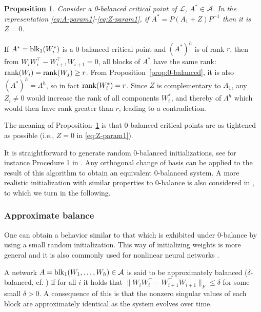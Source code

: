 \documentclass{article}
\makeatletter
\renewenvironment{proof}[1][\proofname]{
  \par\pushQED{\qed}\normalfont
  \topsep6\p@\@plus6\p@\relax
  \trivlist\item[\hskip\labelsep\bfseries#1\@addpunct{.}]
  \ignorespaces
}{
  \popQED\endtrivlist\@endpefalse
}
\newtheorem{proposition}{Proposition}
\def\rank{{\rm rank}}
\def\block{{\rm blk}}
\newcommand{\1}{\mathds{1}}
\makeatother
\begin{document}
\begin{proposition}
\label{prop:0-bal-crit-point}
Consider a 0-balanced critical point of $ \mathcal{L}$, $ A^\ast \in \mathcal{A}$.
In the representation \eqref{eq:A-param1}-\eqref{eq:Z-param1}, if $ A^\ast = P( A_1 + Z ) P^{-1} $ then it is $ Z = 0 $.
\end{proposition}
\begin{proof}
If $A^\ast =\block_1(W_i^\ast)$ is a 0-balanced critical point and $ (A^\ast)^h $ is of rank $ r $, then from $ W_i W_i^\top - W_{i+1}^\top W_{i+1} =0$, all blocks of $ A^\ast $ have the same rank: $ \rank(W_i) = \rank(W_j)  \geq r $. From Proposition~\ref{prop:0-balanced}, it is also $ (A^\ast)^h = \Lambda^h $, so in fact $ \rank(W_i^\ast) = r $. Since $ Z $ is complementary to $ A_1 $, any $ Z_i \neq 0 $ would increase the rank of all components $ W_i^\ast$, and thereby of $ \Lambda^h $ which would then have rank greater than $ r $, leading to a contradiction.
\end{proof}
The meaning of Proposition~\ref{prop:0-bal-crit-point} is that 0-balanced critical points are as tightened as possible (i.e., $ Z=0$ in \eqref{eq:Z-param1}).

It is straightforward to generate random 0-balanced initializations, see for instance Procedure 1 in \cite{arora2018convergence}. Any orthogonal change of basis can be applied to the result of this algorithm to obtain an equivalent 0-balanced system. A more realistic initialization with similar properties to 0-balance is also considered in \cite{arora2018convergence}, to which we turn in the following.


\subsubsection{Approximate balance}
\label{sec:delta-bal}

One can obtain a behavior similar to that which is exhibited under 0-balance by using a small random initialization. This way of initializing weights is more general and it is also commonly used for nonlinear neural networks \cite{glorot2010understanding}.

A network $ A = \block_1(W_1, \ldots, W_h) \in \mathcal{ A } $ is said to be approximately balanced ($ \delta $-balanced, cf. \cite{arora2018convergence}) if for all $ i $ it holds that $ \| W_i W_i^\top - W_{i+1}^\top W_{i+1} \|_F \leq \delta $ for some small $ \delta>0$. A consequence of this is that the nonzero singular values of each block are approximately identical as the system evolves over time.
\end{document}
